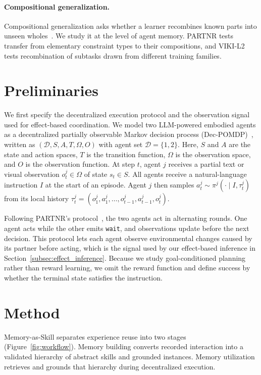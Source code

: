 \documentclass{article}
\theoremstyle{plain}
\theoremstyle{definition}
\theoremstyle{remark}
\begin{document}
\paragraph{Compositional generalization.}
Compositional generalization asks whether a learner recombines known parts into unseen wholes~\citep{lake2018generalization,keysers2020measuring,hupkes2020compositionality}. We study it at the level of agent memory. PARTNR tests transfer from elementary constraint types to their compositions, and VIKI-L2 tests recombination of subtasks drawn from different training families.
 
 
\section{Preliminaries}

We first specify the decentralized execution protocol and the observation signal used for effect-based coordination. We model two LLM-powered embodied agents as a decentralized partially observable Markov decision process (Dec-POMDP)~\citep{oliehoek2016concise}, written as $(\mathcal{D},S,A,T,\Omega,O)$ with agent set $\mathcal{D}=\{1,2\}$. Here, $S$ and $A$ are the state and action spaces, $T$ is the transition function, $\Omega$ is the observation space, and $O$ is the observation function. At step $t$, agent $j$ receives a partial text or visual observation $o_t^j\in\Omega$ of state $s_t\in S$. All agents receive a natural-language instruction $I$ at the start of an episode. Agent $j$ then samples $a_t^j\sim\pi^j(\cdot\mid I,\tau_t^j)$ from its local history $\tau_t^j=(o_1^j,a_1^j,\ldots,o_{t-1}^j,a_{t-1}^j,o_t^j)$.

Following PARTNR's protocol~\citep{PARTNR}, the two agents act in alternating rounds. One agent acts while the other emits \texttt{wait}, and observations update before the next decision. This protocol lets each agent observe environmental changes caused by its partner before acting, which is the signal used by our effect-based inference in Section~\ref{subsec:effect_inference}. Because we study goal-conditioned planning rather than reward learning, we omit the reward function and define success by whether the terminal state satisfies the instruction.
 
 
\section{Method}
\label{sec:method}
 
Memory-as-Skill separates experience reuse into two stages (Figure~\ref{fig:workflow}). Memory building converts recorded interaction into a validated hierarchy of abstract skills and grounded instances. Memory utilization retrieves and grounds that hierarchy during decentralized execution.
\end{document}

